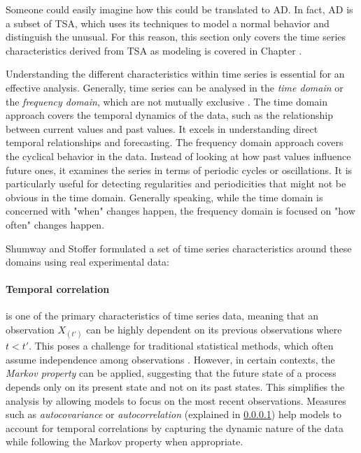 Someone could easily imagine how this could be translated to AD. In fact, AD is a subset of TSA, which uses its techniques to model a normal behavior and distinguish the unusual. For this reason, this section only covers the time series characteristics derived from TSA as modeling is covered in Chapter .

Understanding the different characteristics within time series is essential for an effective analysis. Generally, time series can be analysed in the \textit{time domain} or the \textit{frequency domain}, which are not mutually exclusive \cite{Shumway2017}.
The time domain approach covers the temporal dynamics of the data, such as the relationship between current values and past values. It excels in understanding direct temporal relationships and forecasting.
The frequency domain approach covers the cyclical behavior in the data. Instead of looking at how past values influence future ones, it examines the series in terms of periodic cycles or oscillations. It is particularly useful for detecting regularities and periodicities that might not be obvious in the time domain.
Generally speaking, while the time domain is concerned with "when" changes happen, the frequency domain is focused on "how often" changes happen.

Shumway and Stoffer \cite{Shumway2017} formulated a set of time series characteristics around these domains using real experimental data:

\paragraph{Temporal correlation} is one of the primary characteristics of time series data, meaning that an observation $X_(t')$ can be highly dependent on its previous observations where $t<t'$. This poses a challenge for traditional statistical methods, which often assume independence among observations \cite{Student1908, PEARSON1920, Fisher1992, Russell2020, Edgeworth}. However, in certain contexts, the \textit{Markov property} can be applied, suggesting that the future state of a process depends only on its present state and not on its past states. This simplifies the analysis by allowing models to focus on the most recent observations. Measures such as \textit{autocovariance} or \textit{autocorrelation} (explained in \ref{}) help models to account for temporal correlations by capturing the dynamic nature of the data while following the Markov property when appropriate.

